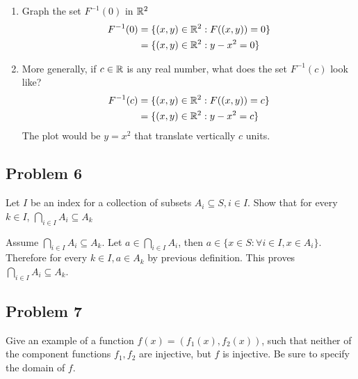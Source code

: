 \documentclass[11pt]{article}
\begin{document}
\begin{enumerate}
  \item Graph the set $F^{-1}(0)$ in $\mathbb{R}^2$ \\
  \[
    \begin{split}
      F^{-1}(0) &= \{ (x, y)\in \mathbb{R}^2: F((x, y)) = 0 \} \\
      &= \{ (x, y)\in \mathbb{R}^2: y - x^2 = 0 \}
    \end{split}
  \]
  \begin{center}
  \end{center}
  \item More generally, if $c \in \mathbb{R}$ is any real number, what does the set $F^{-1}(c)$ look like?
  \[
    \begin{split}
      F^{-1}(c) &= \{ (x, y)\in \mathbb{R}^2: F((x, y)) = c \} \\
      &= \{ (x, y)\in \mathbb{R}^2: y - x^2 = c \}
    \end{split}
  \]
  The plot would be $y=x^2$ that translate vertically $c$ units.
\end{enumerate}


\subsection*{Problem 6}
Let $I$ be an index for a collection of subsets $A_{i}\subseteq S, i \in I$. Show that for every $k \in I$, $\bigcap_{i\in I}A_{i}\subseteq A_{k}$

\begin{solution}
  $ $\\
  Assume $\bigcap_{i\in I}A_{i}\subseteq A_{k}$. Let $a\in \bigcap_{i\in I}A_{i}$, then $a\in \{ x\in S: \forall i\in I, x\in A_i\}$. Therefore for every $k\in I, a \in A_k$ by previous definition. This proves $\bigcap_{i\in I}A_{i}\subseteq A_{k}$.
\end{solution}




\subsection*{Problem 7}
Give an example of a function $f(x) =(f_1(x), f_2(x))$, such that neither of the component functions $f_1,f_2$ are injective, but $f$ is injective. Be sure to specify the domain of $f$.
\end{document}
